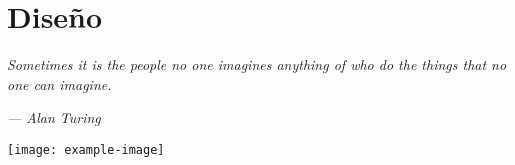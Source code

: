 \chapter{Diseño}\label{diseno}

\epigraph{\textit{Sometimes it is the people no one imagines anything of who do the things that no one can imagine.     
	}}{\textit{— Alan Turing}}
	\vspace*{8cm}
	\begin{center}
		\centering
		\texttt{[image: example-image]}
	\end{center}
	\thispagestyle{empty}
	\newpage
	\vspace*{1cm}

